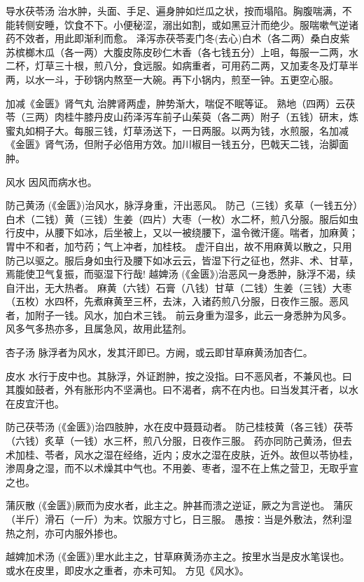 \documentclass[a4paper,12pt,UTF8,twoside]{ctexbook}
\begin{document}
	导水茯苓汤
	治水肿，头面、手足、遍身肿如烂瓜之状，按而塌陷。胸腹喘满，不能转侧安睡，饮食不下。小便秘涩，溺出如割，或如黑豆汁而绝少。服喘嗽气逆诸药不效者，用此即渐利而愈。
	泽泻赤茯苓麦门冬(去心)白术（各二两）桑白皮紫苏槟榔木瓜（各一两）大腹皮陈皮砂仁木香（各七钱五分）上咀，每服一二两，水二杯，灯草三十根，煎八分，食远服。如病重者，可用药二两，又加麦冬及灯草半两，以水一斗，于砂锅内熬至一大碗。再下小锅内，煎至一钟。五更空心服。
	
	加减《金匮》肾气丸
	治脾肾两虚，肿势渐大，喘促不眠等证。
	熟地（四两）云茯苓（三两）肉桂牛膝丹皮山药泽泻车前子山茱萸（各二两）附子（五钱）研末，炼蜜丸如桐子大。每服三钱，灯草汤送下，一日两服。以两为钱，水煎服，名加减《金匮》肾气汤，但附子必倍用方效。加川椒目一钱五分，巴戟天二钱，治脚面肿。
	
	
	风水	
	因风而病水也。
	
	防己黄汤
	(《金匮》)治风水，脉浮身重，汗出恶风。
	防己（三钱）炙草（一钱五分）白术（二钱）黄（三钱）生姜（四片）大枣（一枚）水二杯，煎八分服。服后如虫行皮中，从腰下如冰，后坐被上，又以一被绕腰下，温令微汗瘥。喘者，加麻黄；胃中不和者，加芍药；气上冲者，加桂枝。
	虚汗自出，故不用麻黄以散之，只用防己以驱之。服后身如虫行及腰下如冰云云，皆湿下行之征也，然非、术、甘草，焉能使卫气复振，而驱湿下行哉!
	越婢汤
	(《金匮》)治恶风一身悉肿，脉浮不渴，续自汗出，无大热者。
	麻黄（六钱）石膏（八钱）甘草（二钱）生姜（三钱）大枣（五枚）水四杯，先煮麻黄至三杯，去沫，入诸药煎八分服，日夜作三服。恶风者，加附子一钱。风水，加白术三钱。
	前云身重为湿多，此云一身悉肿为风多。风多气多热亦多，且属急风，故用此猛剂。
	
	杏子汤
	脉浮者为风水，发其汗即已。方阙，或云即甘草麻黄汤加杏仁。
	
	
	皮水	
	水行于皮中也。其脉浮，外证跗肿，按之没指。曰不恶风者，不兼风也。曰其腹如鼓者，外有胀形内不坚满也。曰不渴者，病不在内也。曰当发其汗者，以水在皮宜汗也。
	
	防己茯苓汤
	(《金匮》)治四肢肿，水在皮中聂聂动者。
	防己桂枝黄（各三钱）茯苓（六钱）炙草（一钱）水三杯，煎八分服，日夜作三服。
	药亦同防己黄汤，但去术加桂、苓者，风水之湿在经络，近内；皮水之湿在皮肤，近外。故但以苓协桂，渗周身之湿，而不以术燥其中气也。不用姜、枣者，湿不在上焦之营卫，无取乎宣之也。
	
	蒲灰散
	(《金匮》)厥而为皮水者，此主之。肿甚而溃之逆证，厥之为言逆也。
	蒲灰（半斤）滑石（一斤）为末。饮服方寸匕，日三服。
	愚按∶当是外敷法，然利湿热之剂，亦可内服外掺也。
	
	越婢加术汤
	(《金匮》)里水此主之，甘草麻黄汤亦主之。按里水当是皮水笔误也。或水在皮里，即皮水之重者，亦未可知。
	方见《风水》。
	
\end{document}
